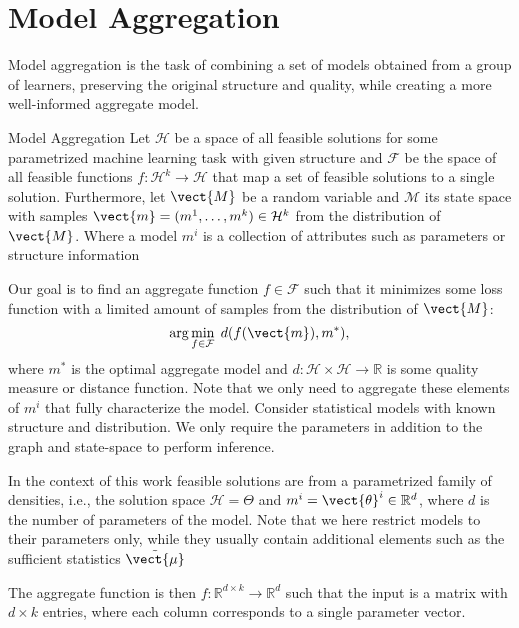 
\chapter{Model Aggregation}
\label{chapter:ch3}
Model aggregation is the task of combining a set of models obtained from a group of learners, preserving the original structure and quality, while creating a more well-informed aggregate model.
\begin{definition}[parbox=false]{Model Aggregation}
    Let $\mathcal{H}$ be a space of all feasible solutions for some parametrized machine learning task with given structure and $\mathcal{F}$ be the space of all feasible functions $f: \mathcal{H}^k \rightarrow \mathcal{H}$ that map a set of feasible solutions to a single solution.
    Furthermore, let $\vect{M}$ be a random variable and $\mathcal{M}$ its state space with samples  $\vect{m} = (m^1, \ldots, m^k) \in \mathcal{H}^k$ from the distribution of $\vect{M}$.
    Where a model $m^i$ is a collection of attributes such as parameters or structure information

    Our goal is to find an aggregate function $f \in \mathcal{F}$ such that it minimizes some loss function with a limited amount of samples from the distribution of $\vect{M}$:
    \begin{equation}
        \label{eq:regret}
        \arg\min_{f \in \mathcal{F}} \; d(f(\vect{m}), m^*),
    \end{equation}
    where $m^*$ is the optimal aggregate model and $d: \mathcal{H} \times \mathcal{H} \rightarrow \mathbb{R}$ is some quality measure or distance function.
    Note that we only need to aggregate these elements of $m^i$ that fully characterize the model.
    Consider statistical models with known structure and distribution. 
    We only require the parameters in addition to the graph and state-space to perform inference.
\end{definition}

In the context of this work feasible solutions are from a parametrized family of densities, i.e., the solution space $\mathcal{H} = \Theta$ and  $m^i = \vect{\theta}^i \in \mathbb{R}^d$, where $d$ is the number of parameters of the model. 
Note that we here restrict models to their parameters only, while they usually contain additional elements such as the sufficient statistics $\tilde{\vect{\mu}}$

The aggregate function is then $f: \mathbb{R}^{d \times k} \rightarrow \mathbb{R}^{d}$ such that the input is a matrix with $d \times k$ entries, where each column corresponds to a single parameter vector.

